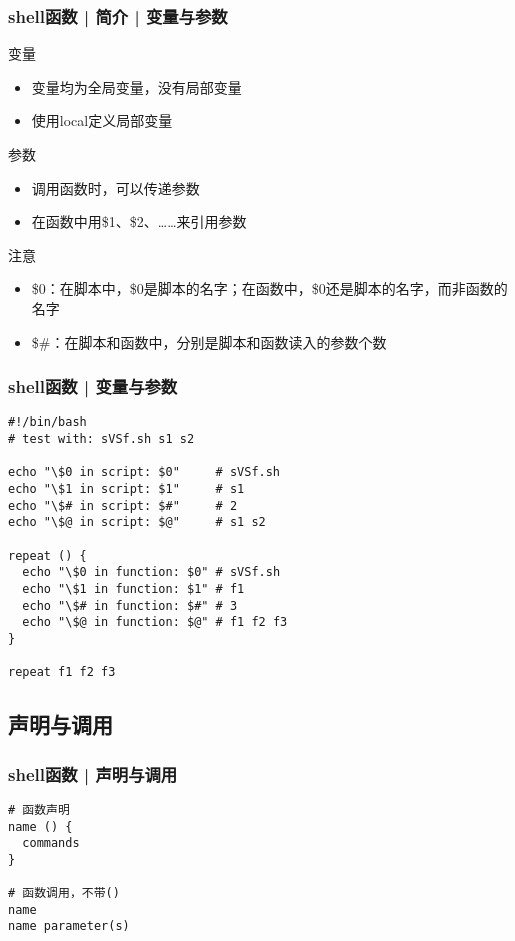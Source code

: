 \begin{frame}
  \frametitle{shell函数 | 简介 | \alert{变量与参数}}
  \begin{block}{变量}
    \begin{itemize}
      \item 变量均为全局变量，没有局部变量
      \item 使用local定义局部变量
    \end{itemize}
  \end{block}
  \pause
  \begin{block}{参数}
    \begin{itemize}
      \item 调用函数时，可以传递参数
      \item 在函数中用\$1、\$2、……来引用参数
    \end{itemize}
  \end{block}
  \pause
  \begin{block}{注意}
    \begin{itemize}
      \item \$0：在脚本中，\$0是脚本的名字；在函数中，\$0还是脚本的名字，而非函数的名字
      \item \$\#：在脚本和函数中，分别是脚本和函数读入的参数个数
    \end{itemize}
  \end{block}
\end{frame}

\begin{frame}[fragile]
  \frametitle{shell函数 | \alert{变量与参数}}
  \vspace{-0.5em}
\begin{lstlisting}
#!/bin/bash
# test with: sVSf.sh s1 s2

echo "\$0 in script: $0"     # sVSf.sh
echo "\$1 in script: $1"     # s1
echo "\$# in script: $#"     # 2
echo "\$@ in script: $@"     # s1 s2

repeat () {
  echo "\$0 in function: $0" # sVSf.sh
  echo "\$1 in function: $1" # f1
  echo "\$# in function: $#" # 3
  echo "\$@ in function: $@" # f1 f2 f3
}

repeat f1 f2 f3
\end{lstlisting}
\end{frame}

\subsection{声明与调用}
\begin{frame}[fragile]
  \frametitle{shell函数 | \alert{声明与调用}}
\begin{lstlisting}
# 函数声明
name () {
  commands
}

# 函数调用，不带()
name
name parameter(s)
\end{lstlisting}
\end{frame}

